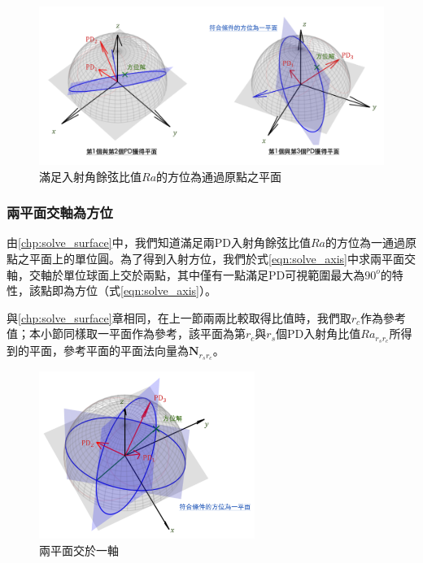        \begin{figure}[h]
            \centering
            \includegraphics[width=14cm]{ch3pic/solve_surface.png}
            \caption{滿足入射角餘弦比值$Ra$的方位為通過原點之平面}
            \label{pic:solve_surface}
        \end{figure}

    \subsubsection{兩平面交軸為方位}
    \label{chp:solve_axis}

        由\ref{chp:solve_surface}中，我們知道滿足兩PD入射角餘弦比值$Ra$的方位為一通過原點之平面上的單位圓。為了得到入射方位，我們於式\ref{eqn:solve_axis}中求兩平面交軸，交軸於單位球面上交於兩點，其中僅有一點滿足PD可視範圍最大為$90^o$的特性，該點即為方位（式\ref{eqn:solve_axis}）。

        與\ref{chp:solve_surface}章相同，在上一節兩兩比較取得比值時，我們取$r_c$作為參考值；本小節同樣取一平面作為參考，該平面為第$r_c$與$r_s$個PD入射角比值$Ra_{r_sr_c}$所得到的平面，參考平面的平面法向量為$\boldsymbol{N}_{r_sr_c}$。

        \begin{figure}[h]
            \centering
            \includegraphics[width=7cm]{ch3pic/solve_axis.png}
            \caption{兩平面交於一軸}
            \label{pic:solve_axis}
        \end{figure}

